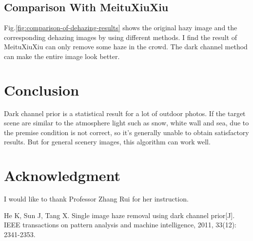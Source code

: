 \documentclass[journal,comsoc]{IEEEtran}
\begin{document}
\subsection{Comparison With MeituXiuXiu}
\label{subsec:comparison-with-meituxiuxiu}

Fig.\ref{fig:comparison-of-dehazing-results} shows the original hazy image and the
corresponding dehazing images by using different methods. I find the result of
MeituXiuXiu can only remove some haze in the crowd. The dark channel method can
make the entire image look better.

\section{Conclusion}

Dark channel prior is a statistical result for a lot of outdoor photos. If the target scene are
similar to the atmosphere light such as snow, white wall and sea, due to the premise condition is not
correct, so it's generally unable to obtain satisfactory results. But for general scenery images,
this algorithm can work well.

\section*{Acknowledgment}
I would like to thank Professor Zhang Rui for her instruction.

\begin{thebibliography}{1}
  He K, Sun J, Tang X. Single image haze removal using dark channel prior[J].
  IEEE transactions on pattern analysis and machine intelligence, 2011, 33(12): 2341-2353.
\end{thebibliography}



\vfill
\end{document}
